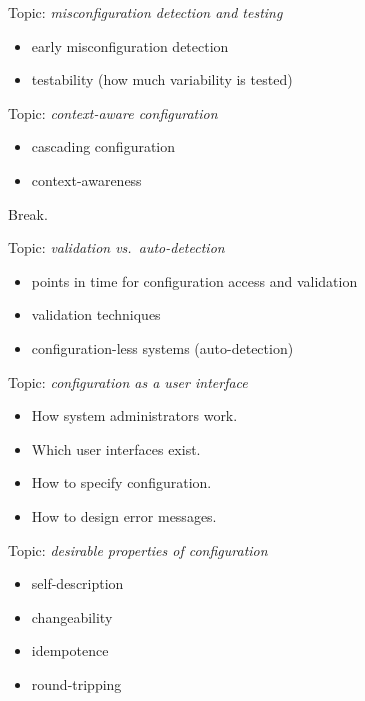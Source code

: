 \begin{frame}
	Topic: \textit{misconfiguration detection and testing}
	\begin{itemize}
		\item early misconfiguration detection
		\item testability (how much variability is tested)
	\end{itemize}
\end{frame}

\begin{frame}
	Topic: \textit{context-aware configuration}
	\begin{itemize}
		\item cascading configuration
		\item context-awareness
	\end{itemize}
\end{frame}

\begin{assignment}
	\begin{task}
	Break.
	\end{task}
\end{assignment}

\begin{frame}
	Topic: \textit{validation vs.\ auto-detection}
	\begin{itemize}
		\item points in time for configuration access and validation
		\item validation techniques
		\item configuration-less systems (auto-detection)
	\end{itemize}
\end{frame}

\begin{frame}
	Topic: \textit{configuration as a user interface}
	\begin{itemize}
		\item How system administrators work.
		\item Which user interfaces exist.
		\item How to specify configuration.
		\item How to design error messages.
	\end{itemize}
\end{frame}

\begin{frame}
	Topic: \textit{desirable properties of configuration}
	\begin{itemize}
		\item self-description
		\item changeability
		\item idempotence
		\item round-tripping
	\end{itemize}
\end{frame}

